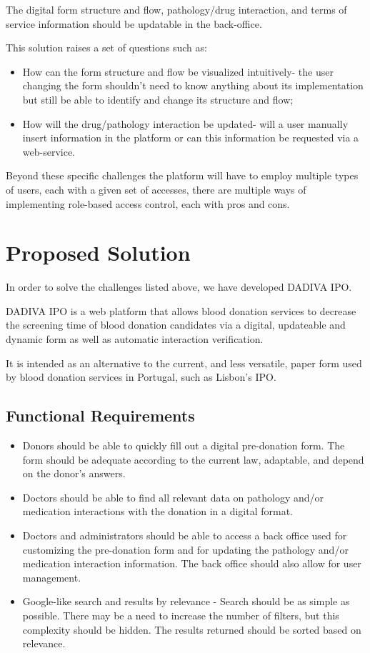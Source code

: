 The digital form structure and flow, pathology/drug interaction, and terms of service information should be updatable in the back-office. 

This solution raises a set of questions such as:
\begin{itemize}
	\item How can the form structure and flow be visualized intuitively- the user changing the form shouldn’t need to know anything about its implementation but still be able to identify and change its structure and flow;
	\item How will the drug/pathology interaction be updated- will a user manually insert information in the platform or can this information be requested via a web-service. 
\end{itemize}

Beyond these specific challenges the platform will have to employ multiple types of users, each with a given set of accesses, there are multiple ways of implementing role-based access control, each with pros and cons.

\section{Proposed Solution}

In order to solve the challenges listed above, we have developed DADIVA IPO.

DADIVA IPO is a web platform that allows blood donation services to decrease the screening time of blood donation candidates via a digital, updateable and dynamic form as well as automatic interaction verification.

It is intended as an alternative to the current, and less versatile, paper form used by blood donation services in Portugal, such as Lisbon's IPO.

\subsection{Functional Requirements}
\begin{itemize}
	\item Donors should be able to quickly fill out a digital pre-donation form. The form should be adequate according to the current law, adaptable, and depend on the donor’s answers.
	
	\item Doctors should be able to find all relevant data on pathology and/or medication interactions with the donation in a digital format.
	
	\item Doctors and administrators should be able to access a back office used for customizing the pre-donation form and for updating the pathology and/or medication interaction information. The back office should also allow for user management.
	
	\item Google-like search and results by relevance - Search should be as simple as possible. There may be a need to increase the number of filters, but this complexity should be hidden. The results returned should be sorted based on relevance.
\end{itemize}

